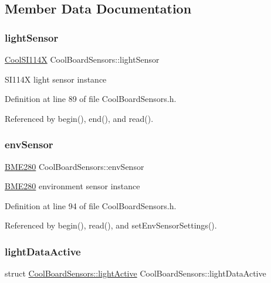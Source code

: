 \subsection{Member Data Documentation}
\mbox{\label{class_cool_board_sensors_ac711c27d0927eb5e73be77f092c48be0}} 
\subsubsection{\texorpdfstring{light\+Sensor}{lightSensor}}
{\footnotesize\ttfamily \hyperlink{class_cool_s_i114_x}{Cool\+S\+I114X} Cool\+Board\+Sensors\+::light\+Sensor}

S\+I114X light sensor instance 

Definition at line 89 of file Cool\+Board\+Sensors.\+h.



Referenced by begin(), end(), and read().

\mbox{\label{class_cool_board_sensors_a868e38985e9a2412829fa2790ca13e2e}} 
\subsubsection{\texorpdfstring{env\+Sensor}{envSensor}}
{\footnotesize\ttfamily \hyperlink{class_b_m_e280}{B\+M\+E280} Cool\+Board\+Sensors\+::env\+Sensor}

\hyperlink{class_b_m_e280}{B\+M\+E280} environment sensor instance 

Definition at line 94 of file Cool\+Board\+Sensors.\+h.



Referenced by begin(), read(), and set\+Env\+Sensor\+Settings().

\mbox{\label{class_cool_board_sensors_ac4deb1cf41bac8b91c780c92fab00ba4}} 
\subsubsection{\texorpdfstring{light\+Data\+Active}{lightDataActive}}
{\footnotesize\ttfamily struct \hyperlink{class_cool_board_sensors_df/da3/struct_cool_board_sensors_1_1light_active}{Cool\+Board\+Sensors\+::light\+Active} Cool\+Board\+Sensors\+::light\+Data\+Active\hspace{0.3cm}{\ttfamily [private]}}




